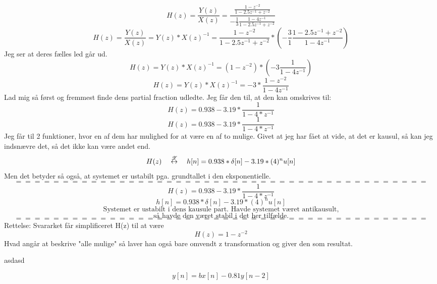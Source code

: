 \begin{Opgaver}
\begin{kapitel}[Z transformation]
\begin{Opgave}
\begin{UnderOpgave}
                \[H(z) = \frac{Y(z)}{X(z)} = \frac{\frac{1 - z^{-2}}{1 - 2.5z^{-1} + z^{-2}}}{-\frac{1}{3}\frac{1 - 4z^{-1}}{1 - 2.5z^{-1} + z^{-2}}}\]
                \[H(z) = \frac{Y(z)}{X(z)} = Y(z) * X(z)^{-1} = \frac{1 - z^{-2}}{1 - 2.5z^{-1} + z^{-2}} * (-\frac{3}{1}\frac{1 - 2.5z^{-1} + z^{-2}}{1 - 4z^{-1}})\]
                Jeg ser at deres fælles led går ud. 
                \[H(z) = Y(z) * X(z)^{-1} = (1 - z^{-2}) * (-3\frac{1}{1 - 4z^{-1}})\]
                \[H(z) = Y(z) * X(z)^{-1} = -3 * \frac{1 - z^{-2}}{1 - 4z^{-1}}\]
                Lad mig så først og fremmest finde dens partial fraction udledte. 
                Jeg får den til, at den kan omskrives til: 
                \[H(z) = 0.938 - 3.19 * \frac{1}{1 - 4*z^{-1}}\]
                \[H(z) = 0.938 - 3.19 * \frac{1}{1 - 4*z^{-1}}\]
                Jeg får til 2 funktioner, hvor en af dem har mulighed for at være en af to mulige. Givet at jeg har fået at vide, at det er kausul, så kan jeg indsnævre det, så det ikke kan være andet end. 
                \[H(z) \transformation{Z} h[n] = 0.938 * \delta[n] - 3.19 * (4)^nu[n]\]
                Men det betyder så også, at systemet er ustabilt pga. grundtallet i den eksponentielle. 
                \[============================================\]
                \[H(z) = 0.938 - 3.19 * \frac{1}{1 - 4*z^{-1}}\]
                \[h[n] = 0.938 * \delta[n] - 3.19 * (4)^nu[n]\]
                \[\text{Systemet er ustabilt i dens kausule part. 
                Havde systemet været antikausult,}\]
                \[\text{så havde den været stabil i det her tilfælde.} \]
                \[============================================\]
                \newline
                \color{teal}
                Rettelse: 
                Svararket får simplificeret H(z) til at være
                \[H(z) = 1 - z^{-2}\]
                Hvad angår at beskrive "alle mulige" så laver han også bare omvendt z transformation og giver den som resultat. 
            \end{UnderOpgave}
        \end{Opgave}
    \end{kapitel}
    \begin{kapitel}
        asdasd
    \end{kapitel}
    \begin{kapitel}
        \begin{Udklip}
            \begin{Opgave}
                \[y[n] = bx[n] - 0.81y[n - 2]\]
    

\end{Opgave}
\end{Udklip}
\end{kapitel}
\end{Opgaver}
